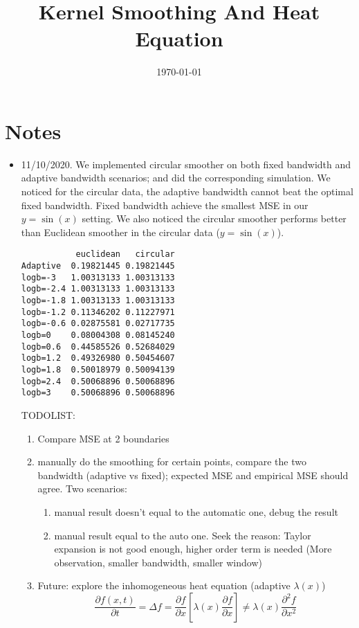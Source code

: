 \documentclass{article}
\title{Kernel Smoothing And Heat Equation}
\date{\today}
\begin{document}
\maketitle

\section{Notes}
\label{sec:notes}

\begin{itemize}
\item 11/10/2020. We implemented circular smoother on both fixed bandwidth and adaptive bandwidth scenarios; and did the corresponding simulation. We noticed for the circular data, the adaptive bandwidth cannot beat the optimal fixed bandwidth. Fixed bandwidth achieve the smallest MSE in our $y=\sin(x)$ setting. We also noticed the circular smoother performs better than Euclidean smoother in the circular data ($y=\sin(x)$). 

\begin{verbatim}
           euclidean   circular
Adaptive  0.19821445 0.19821445
logb=-3   1.00313133 1.00313133
logb=-2.4 1.00313133 1.00313133
logb=-1.8 1.00313133 1.00313133
logb=-1.2 0.11346202 0.11227971
logb=-0.6 0.02875581 0.02717735
logb=0    0.08004308 0.08145240
logb=0.6  0.44585526 0.52684029
logb=1.2  0.49326980 0.50454607
logb=1.8  0.50018979 0.50094139
logb=2.4  0.50068896 0.50068896
logb=3    0.50068896 0.50068896
\end{verbatim}


TODOLIST:
  \begin{enumerate}
    \item Compare MSE at 2 boundaries 
    \item manually do the smoothing for certain points, compare the two bandwidth (adaptive vs fixed); expected MSE and empirical MSE should agree. Two scenarios:
    \begin{enumerate}
    \item manual result doesn't equal to the automatic one, debug the result
    \item manual result equal to the auto one. Seek the reason: Taylor expansion is not good enough, higher order term is needed (More observation, smaller bandwidth, smaller window)
    \end{enumerate}
    \item Future: explore the inhomogeneous heat equation (adaptive $\lambda(x)$) 
    $$\frac{\partial f(x,t)}{\partial t}  = \Delta f = \frac{\partial f}{\partial x}[\lambda(x)\frac{\partial f}{\partial x}] \neq  \lambda(x)\frac{\partial^2 f}{
    \partial x^2} $$


\end{enumerate}
\end{itemize}
\end{document}
